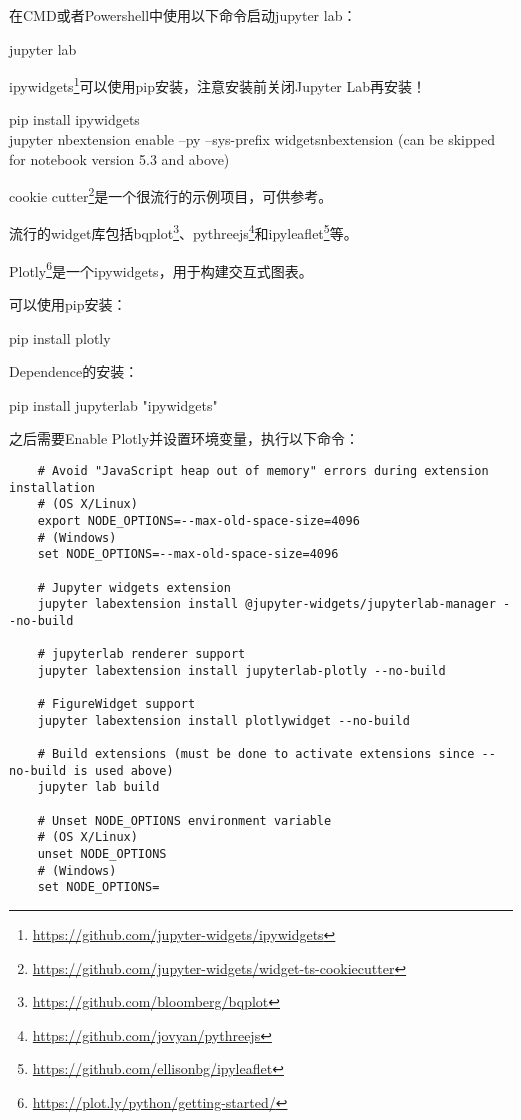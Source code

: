 在CMD或者Powershell中使用以下命令启动jupyter lab：

\begin{tcolorbox}
    jupyter lab
\end{tcolorbox}

ipywidgets\footnote{\url{https://github.com/jupyter-widgets/ipywidgets}}可以使用pip安装，注意安装前关闭Jupyter Lab再安装！

\begin{tcolorbox}
    pip install ipywidgets \\
    jupyter nbextension enable --py --sys-prefix widgetsnbextension  (can be skipped for notebook version 5.3 and above)
\end{tcolorbox}

cookie cutter\footnote{\url{https://github.com/jupyter-widgets/widget-ts-cookiecutter}}是一个很流行的示例项目，可供参考。

流行的widget库包括bqplot\footnote{\url{https://github.com/bloomberg/bqplot}}、pythreejs\footnote{\url{https://github.com/jovyan/pythreejs}}和ipyleaflet\footnote{\url{https://github.com/ellisonbg/ipyleaflet}}等。

Plotly\footnote{\url{https://plot.ly/python/getting-started/}}是一个ipywidgets，用于构建交互式图表。

可以使用pip安装：

\begin{tcolorbox}
    pip install plotly
\end{tcolorbox}

Dependence的安装：

\begin{tcolorbox}
    pip install jupyterlab "ipywidgets"
\end{tcolorbox}

之后需要Enable Plotly并设置环境变量，执行以下命令：

\begin{verbatim}
    # Avoid "JavaScript heap out of memory" errors during extension installation
    # (OS X/Linux)
    export NODE_OPTIONS=--max-old-space-size=4096
    # (Windows)
    set NODE_OPTIONS=--max-old-space-size=4096

    # Jupyter widgets extension
    jupyter labextension install @jupyter-widgets/jupyterlab-manager --no-build

    # jupyterlab renderer support
    jupyter labextension install jupyterlab-plotly --no-build

    # FigureWidget support
    jupyter labextension install plotlywidget --no-build

    # Build extensions (must be done to activate extensions since --no-build is used above)
    jupyter lab build

    # Unset NODE_OPTIONS environment variable
    # (OS X/Linux)
    unset NODE_OPTIONS
    # (Windows)
    set NODE_OPTIONS=
\end{verbatim}

